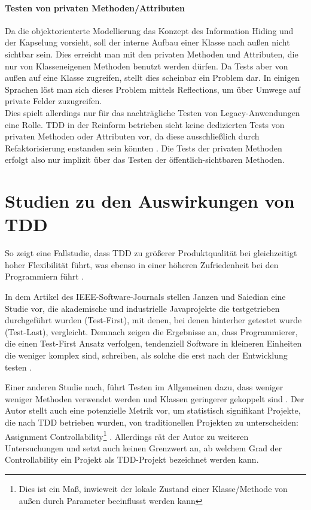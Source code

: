   \paragraph{Testen von privaten Methoden/Attributen} Da die objektorienterte Modellierung das Konzept des Information Hiding und der Kapselung vorsieht, soll der interne Aufbau einer Klasse nach außen nicht sichtbar sein. Dies erreicht man mit den privaten Methoden und Attributen, die nur von Klasseneigenen Methoden benutzt werden dürfen. Da Tests aber von außen auf eine Klasse zugreifen, stellt dies scheinbar ein Problem dar. In einigen Sprachen löst man sich dieses Problem mittels Reflections, um über Umwege auf private Felder zuzugreifen. \\
  Dies spielt allerdings nur für das nachträgliche Testen von Legacy-Anwendungen eine Rolle. TDD in der Reinform betrieben sieht keine dedizierten Tests von privaten Methoden oder Attributen vor, da diese ausschließlich durch Refaktorisierung enstanden sein könnten \citep{caroli_agile_2008}. Die Tests der privaten Methoden erfolgt also nur implizit über das Testen der öffentlich-sichtbaren Methoden.


\section{Studien zu den Auswirkungen von TDD}



So zeigt eine Fallstudie, dass TDD zu größerer Produktqualität bei gleichzeitigt hoher Flexibilität führt, was ebenso in einer höheren Zufriedenheit bei den Programmiern führt \citep{hans_wasmus_evaluation_2007}.




In dem Artikel des IEEE-Software-Journals stellen Janzen und Saiedian eine Studie vor, die akademische und industrielle Javaprojekte die testgetrieben durchgeführt wurden (Test-First), mit denen, bei denen hinterher getestet wurde (Test-Last), vergleicht. Demnach zeigen die Ergebnisse an, dass Programmierer, die einen Test-First Ansatz verfolgen, tendenziell Software in kleineren Einheiten die weniger komplex sind, schreiben, als solche die erst nach der Entwicklung testen \citep{janzen_does_2008}.


Einer anderen Studie nach, führt Testen im Allgemeinen dazu, dass weniger weniger Methoden verwendet werden und Klassen geringerer gekoppelt sind \cite{mueller_effect_2006}. Der Autor stellt auch eine potenzielle Metrik vor, um statistisch signifikant Projekte, die nach TDD betrieben wurden, von traditionellen Projekten zu unterscheiden: Assignment Controllability\footnote{Dies ist ein Maß, inwieweit der lokale Zustand einer Klasse/Methode von außen durch Parameter beeinflusst werden kann} \cite{mueller_effect_2006}. Allerdings rät der Autor zu weiteren Untersuchungen und setzt auch keinen Grenzwert an, ab welchem Grad der Controllability ein Projekt als TDD-Projekt bezeichnet werden kann.

